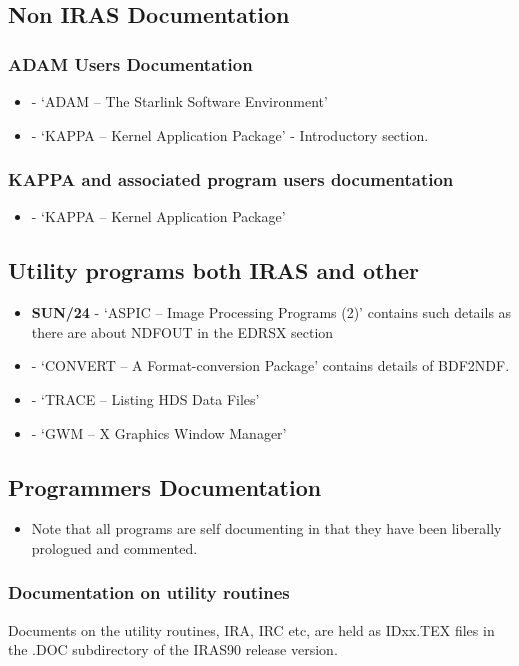 \documentclass[twoside,11pt]{starlink}
\begin{document}
\subsection{Non IRAS Documentation}
\subsubsection{ADAM Users Documentation}
\begin{itemize}
\item \textbf{} - `ADAM -- The Starlink Software Environment'
\item \textbf{} - `KAPPA -- Kernel Application
Package' - Introductory section.
\end{itemize}
\subsubsection{KAPPA and associated program users documentation}
\begin{itemize}
\item \textbf{} - `KAPPA -- Kernel Application Package'
\end{itemize}
\subsection{Utility programs both IRAS and other}
\begin{itemize}
\item \textbf{SUN/24} - `ASPIC -- Image Processing Programs (2)' contains such
details as there are about NDFOUT in the EDRSX section
\item \textbf{} - `CONVERT -- A Format-conversion Package'
contains details of BDF2NDF.
\item \textbf{} - `TRACE -- Listing HDS Data Files'
\item \textbf{} - `GWM -- X Graphics Window Manager'
\end{itemize}

\subsection{Programmers Documentation}
\begin{itemize}
\item Note that all programs are self documenting in that they have been
liberally prologued and commented.
\end{itemize}
\subsubsection{Documentation on utility routines}
Documents on the utility routines, IRA, IRC etc, are held as IDxx.TEX files
in the .DOC subdirectory of the IRAS90 release version.
\end{document}
